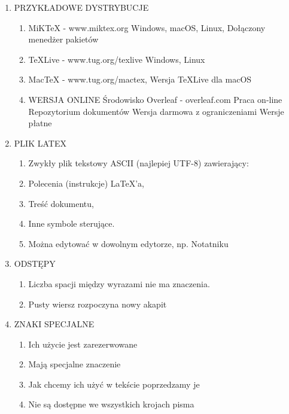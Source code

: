 \documentclass[a4paper,twoside,onecolumn]{report}
\begin{document}
\begin{enumerate}
			\item PRZYKŁADOWE DYSTRYBUCJE
			\begin{enumerate}
				\item MiKTeX - www.miktex.org Windows, macOS, Linux, Dołączony menedżer pakietów
				\item TeXLive - www.tug.org/texlive Windows, Linux 
				\item MacTeX - www.tug.org/mactex, Wersja TeXLive dla macOS
				\item WERSJA ONLINE Środowisko Overleaf - overleaf.com Praca on-line Repozytorium dokumentów Wersja darmowa z ograniczeniami Wersje płatne
			\end{enumerate}

			\item PLIK LATEX
			\begin{enumerate}
				\item Zwykły plik tekstowy ASCII (najlepiej UTF-8) zawierający:
				\item Polecenia (instrukcje) LaTeX’a,
				\item Treść dokumentu,
				\item Inne symbole sterujące.
				\item Można edytować w dowolnym edytorze, np. Notatniku
			\end{enumerate}

			\item ODSTĘPY
			\begin{enumerate}
				\item Liczba spacji między wyrazami nie ma znaczenia.
				\item Pusty wiersz rozpoczyna nowy akapit
			\end{enumerate}

			\item ZNAKI SPECJALNE
			\begin{enumerate}
				\item Ich użycie jest zarezerwowane
				\item Mają specjalne znaczenie
				\item Jak chcemy ich użyć w tekście poprzedzamy je
				\item Nie są dostępne we wszystkich krojach pisma 
			\end{enumerate}


\end{enumerate}
\end{document}
